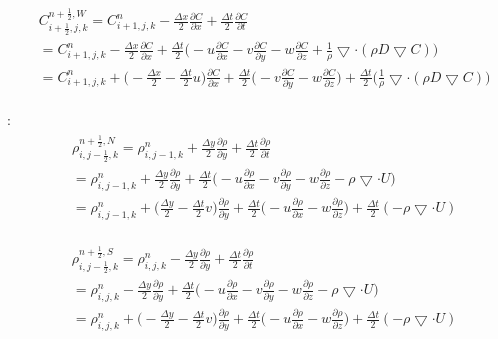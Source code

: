 \documentclass{article}
\numberwithin{equation}{subsection}
\begin{document}
\begin{align}
\begin{split}
& C_{i+\frac{1}{2},j,k}^{n+\frac{1}{2},W} = C_{i+1,j,k}^n - \frac{\Delta x}{2} \frac{\partial C}{\partial x} + \frac{\Delta t}{2} \frac{\partial C}{\partial t} \\
&= C_{i+1,j,k}^{n} - \frac{\Delta x}{2} \frac{\partial C}{\partial x} + \frac{\Delta t}{2} \Big( -u\frac{\partial C}{\partial x} - v\frac{\partial C}{\partial y} - w\frac{\partial C}{\partial z} + \frac{1}{\rho} \bigtriangledown \cdot( \rho D \bigtriangledown C) \Big) \\
&= C_{i+1,j,k}^{n} + \Big( -\frac{\Delta x}{2} - \frac{\Delta t}{2}u\Big)\frac{\partial C}{\partial x} + \frac{\Delta t}{2} \Big( -v\frac{\partial C}{\partial y} -w\frac{\partial C}{\partial z} \big) + \frac{\Delta t}{2} \Big( \frac{1}{\rho} \bigtriangledown \cdot( \rho D \bigtriangledown C)\Big)
\end{split}
\end{align}

:
\begin{align}
\begin{split}
& \rho_{i,j-\frac{1}{2},k}^{n+\frac{1}{2},N} = \rho_{i,j-1,k}^n + \frac{\Delta y}{2} \frac{\partial \rho}{\partial y} + \frac{\Delta t}{2} \frac{\partial \rho}{\partial t} \\
& = \rho_{i,j-1,k}^{n} + \frac{\Delta y}{2} \frac{\partial \rho}{\partial y} + \frac{\Delta t}{2} \Big( -u\frac{\partial \rho}{\partial x} - v\frac{\partial \rho}{\partial y} - w\frac{\partial \rho}{\partial z} - \rho \bigtriangledown \cdot U \Big) \\
& = \rho_{i,j-1,k}^{n} + \big( \frac{\Delta y}{2} - \frac{\Delta t}{2}v\big)\frac{\partial \rho}{\partial y} + \frac{\Delta t}{2} \big( - u\frac{\partial \rho}{\partial x} - w\frac{\partial \rho}{\partial z} \big) + \frac{\Delta t}{2} (-\rho \bigtriangledown \cdot U)
\end{split}
\end{align}

\begin{align}
\begin{split}
& \rho_{i,j-\frac{1}{2},k}^{n+\frac{1}{2},S} = \rho_{i,j,k}^n - \frac{\Delta y}{2} \frac{\partial \rho}{\partial y} + \frac{\Delta t}{2} \frac{\partial \rho}{\partial t} \\
& = \rho_{i,j,k}^{n} - \frac{\Delta y}{2} \frac{\partial \rho}{\partial y} + \frac{\Delta t}{2} \Big( -u\frac{\partial \rho}{\partial x} - v\frac{\partial \rho}{\partial y} - w\frac{\partial \rho}{\partial z} - \rho \bigtriangledown \cdot U \Big) \\
& = \rho_{i,j,k}^{n} + \big( -\frac{\Delta y}{2} - \frac{\Delta t}{2}v\big)\frac{\partial \rho}{\partial y} + \frac{\Delta t}{2} \big( - u\frac{\partial \rho}{\partial x} - w\frac{\partial \rho}{\partial z} \big) + \frac{\Delta t}{2} (-\rho \bigtriangledown \cdot U)
\end{split}
\end{align}
\end{document}
